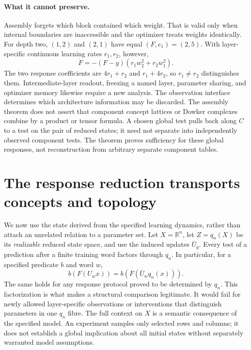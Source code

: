 \documentclass[11pt]{article}
\theoremstyle{definition}\newtheorem{definition}[theorem]{Definition}
\theoremstyle{remark}\newtheorem{remark}[theorem]{Remark}
\newcommand{\R}{\mathbb R}
\begin{document}
\paragraph{What it cannot preserve.}
Assembly forgets which block contained which weight. That is valid only when internal boundaries are inaccessible and the optimizer treats weights identically. For depth two, $(1,2)$ and $(2,1)$ have equal $(F,e_1)=(2,5)$. With layer-specific continuous learning rates $r_1,r_2$, however,
\[
 \dot F=-(F-y)(r_1w_2^2+r_2w_1^2).
\]
The two response coefficients are $4r_1+r_2$ and $r_1+4r_2$, so $r_1\ne r_2$ distinguishes them. Intermediate-layer readout, freezing a named layer, parameter sharing, and optimizer memory likewise require a new analysis. The observation interface determines which architecture information may be discarded.
The assembly theorem does not assert that component concept lattices or
Dowker complexes combine by a product or tensor formula. A chosen global
test pulls back along $C$ to a test on the pair of reduced states; it need
not separate into independently observed component tests. The theorem
proves sufficiency for these global responses, not reconstruction from
arbitrary separate component tables.


\section{The response reduction transports concepts and topology}
\label{sec:comparison}
We now use the state derived from the specified learning dynamics, rather than attach an
unrelated relation to a parameter set. Let $X=\R^n$, let $Z=q_n(X)$ be
its \emph{realizable} reduced state space, and use the induced updates
$\overline U_y$. Every test of a prediction after a finite training word
factors through $q_n$. In particular, for a specified predicate $b$ and
word $w$,
\[
 b(F(U_wx))=b(\overline F(\overline U_wq_n(x))).
\]
The same holds for any response protocol proved to be determined by $q_n$.
This factorization is what makes a structural comparison legitimate. It
would fail for newly allowed layer-specific observations or interventions
that distinguish parameters in one $q_n$ fibre.
The full context on $X$ is a semantic consequence of the specified model.
An experiment samples only selected rows and columns; it does not establish
a global implication about all initial states without separately warranted
model assumptions.
\end{document}
